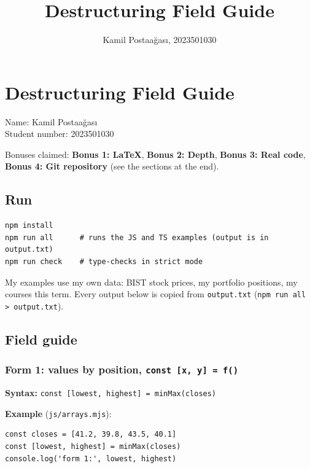 \documentclass[
  11pt,
]{article}
\title{Destructuring Field Guide}
\author{Kamil Postaağası, 2023501030}
\date{}
\newcommand{\passthrough}[1]{#1}
\begin{document}
\maketitle

{
\hypersetup{linkcolor=}
\setcounter{tocdepth}{3}
\tableofcontents
}
\section{Destructuring Field Guide}\label{destructuring-field-guide}

Name: Kamil Postaağası\\
Student number: 2023501030

Bonuses claimed: \textbf{Bonus 1: LaTeX}, \textbf{Bonus 2: Depth},
\textbf{Bonus 3: Real code}, \textbf{Bonus 4: Git repository} (see the
sections at the end).

\subsection{Run}\label{run}

\begin{lstlisting}
npm install
npm run all      # runs the JS and TS examples (output is in output.txt)
npm run check    # type-checks in strict mode
\end{lstlisting}

My examples use my own data: BIST stock prices, my portfolio positions,
my courses this term. Every output below is copied from
\passthrough{\lstinline!output.txt!}
(\passthrough{\lstinline!npm run all > output.txt!}).

\subsection{Field guide}\label{field-guide}

\subsubsection{\texorpdfstring{Form 1: values by position,
\texttt{const\ {[}x,\ y{]}\ =\ f()}}{Form 1: values by position, const {[}x, y{]} = f()}}\label{form-1-values-by-position-const-x-y-f}

\textbf{Syntax:}
\passthrough{\lstinline!const [lowest, highest] = minMax(closes)!}

\textbf{Example} (\passthrough{\lstinline!js/arrays.mjs!}):

\begin{lstlisting}
const closes = [41.2, 39.8, 43.5, 40.1]
const [lowest, highest] = minMax(closes)
console.log('form 1:', lowest, highest)
\end{lstlisting}
\end{document}
